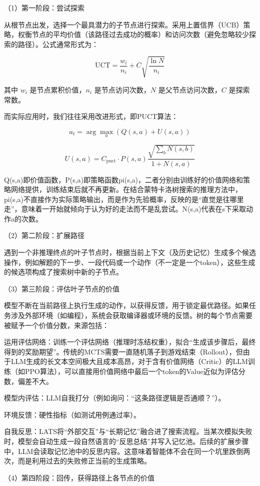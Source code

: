 （1）第一阶段：尝试探索

从根节点出发，选择一个最具潜力的子节点进行探索。采用上置信界（UCB）策略，权衡节点的平均价值（该路径过去成功的概率）和访问次数（避免忽略较少探索的路径）。公式通常形式为：

\[
\mathrm{UCT}=\frac{w_i}{n_i}+C\sqrt{\frac{\ln N}{n_i}}
\]

其中 \(w_i\) 是节点累积价值，\(n_i\) 是节点访问次数，\(N\) 是父节点访问次数，\(C\) 是探索常数。

而实际应用时，我们往往采用改进形式，即PUCT算法：

\[
a_t=\arg\max_a\left(Q(s,a)+U(s,a)\right)
\]

\[
U(s,a)=C_{\mathrm{puct}}\cdot P(s,a)\frac{\sqrt{\sum_b N(s,b)}}{1+N(s,a)}
\]

Q(s,a)即价值函数，P(s,a)即策略函数pi(s,a)，二者分别由训练好的价值网络和策略网络提供，训练结束后就不再更新。在结合蒙特卡洛树搜索的推理方法中，pi(s,a)不直接作为实际策略输出，而是作为先验概率，反映的是``直觉是往哪里走''，意味着一开始就倾向于认为好的走法而不是乱尝试。N(s,a)代表在s下采取动作a的次数。

（2）第二阶段：扩展路径

遇到一个非推理终点的叶子节点时，根据当前上下文（及历史记忆）生成多个候选操作，例如解题的下一步、一段代码或一个动作（不一定是一个token），这些生成的候选项构成了搜索树中新的子节点。

（3）第三阶段：评估叶子节点的价值

模型不断在当前路径上执行生成的动作，以获得反馈，用于锁定最优路径。如果任务涉及外部环境（如编程），系统会获取编译器或环境的反馈。树的每个节点需要被赋予一个价值分数，来源包括：

运用评估网络：训练一个评估网络（推理时冻结权重），拟合``生成该步骤后，最终得到的奖励期望''。传统的MCTS需要一直随机落子到游戏结束（Rollout），但由于LLM生成的长文本空间极大且成本高昂，对于含有价值网络（Critic）的LLM训练（如PPO算法），可以直接用价值网络中最后一个token的Value近似为评估分数，偏差不大。

模型内评估：LLM自我打分（例如询问：``这条路径逻辑是否通顺？''）。

环境反馈：硬性指标（如测试用例通过率）。

自我反思：LATS将``外部交互''与``长期记忆''融合进了搜索流程。当某次模拟失败时，模型会自动生成一段自然语言的``反思总结''并写入记忆池。后续的扩展步骤中，LLM会读取记忆池中的反思内容。这意味着智能体不会在同一个坑里跌倒两次，而是利用过去的失败修正当前的生成策略。

（4）第四阶段：回传，获得路径上各节点的价值

